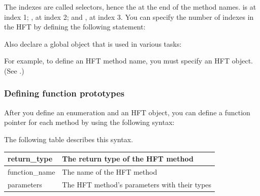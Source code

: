 \documentclass[letterpaper,12pt,english,openany,oneside]{sphinxmanual}
\begin{document}
The indexes are called selectors, hence the  at the end of the method names.  is at index 1; , at index 2; and , at index 3. You can specify the number of indexes in the HFT by defining the following statement:

\begin{sphinxVerbatim}[commandchars=\\\{\}]
\end{sphinxVerbatim}

Also declare a global  object that is used in various tasks:

\begin{sphinxVerbatim}[commandchars=\\\{\}]
  
\end{sphinxVerbatim}

For example, to define an HFT method name, you must specify an HFT object. (See .)


\subsubsection{Defining function prototypes}
\label{\detokenize{Plugins_Hft:defining-function-prototypes}}
After you define an enumeration and an HFT object, you can define a function pointer for each method by using the following syntax:

\begin{sphinxVerbatim}[commandchars=\\\{\}]
      
\end{sphinxVerbatim}

The following table describes this syntax.


\begin{savenotes}\sphinxattablestart
\centering
\begin{tabulary}{\linewidth}[t]{|T|T|}
\hline

return\_type
&
The return type of the HFT method
\\
\hline
function\_name
&
The name of the HFT method
\\
\hline
parameters
&
The HFT method’s parameters with their types
\\
\hline
\end{tabulary}
\par
\sphinxattableend\end{savenotes}
\end{document}

